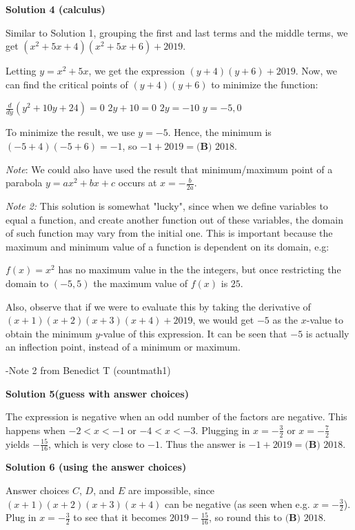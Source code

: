 \begin{enumerate}
 



\textbf{Solution 4 (calculus)}

Similar to Solution 1, grouping the first and last terms and the middle terms, we get $(x^2+5x+4)(x^2+5x+6)+2019$. 

 Letting $y=x^2+5x$, we get the expression $(y+4)(y+6)+2019$. Now, we can find the critical points of $(y+4)(y+6)$ to minimize the function:

 $\frac{d}{dy}(y^2+10y+24)=0$
$2y+10=0$
$2y=-10$
$y=-5,0$

 To minimize the result, we use $y=-5$. Hence, the minimum is $(-5+4)(-5+6)=-1$, so $-1+2019 = \boxed{\textbf{(B) }2018}$.

 \textit{Note}: We could also have used the result that minimum/maximum point of a parabola $y = ax^2 + bx + c$ occurs at $x=-\frac{b}{2a}$.

 \textit{Note 2:} This solution is somewhat "lucky", since when we define variables to equal a function, and create another function out of these variables, the domain of such function may vary from the initial one. This is important because the maximum and minimum value of a function is dependent on its domain, e.g:

 $f(x)=x^2$ has no maximum value in the the integers, but once restricting the domain to $(-5, 5)$ the maximum value of $f(x)$ is $25$.

 Also, observe that if we were to evaluate this by taking the derivative of $(x+1)(x+2)(x+3)(x+4)+2019$, we would get $-5$ as the $x$-value to obtain the minimum $y$-value of this expression. It can be seen that $-5$ is actually an inflection point, instead of a minimum or maximum. 

 -Note 2 from Benedict T (countmath1)

 



\textbf{Solution 5(guess with answer choices)}

The expression is negative when an odd number of the factors are negative. This happens when $-2 < x < -1$ or $-4 < x < -3$. Plugging in $x = -\frac32$ or $x = -\frac72$ yields $-\frac{15}{16}$, which is very close to $-1$. Thus the answer is $-1 + 2019 = \boxed{\textbf{(B) }2018}$.

 



\textbf{Solution 6 (using the answer choices)}

Answer choices $C$, $D$, and $E$ are impossible, since $(x+1)(x+2)(x+3)(x+4)$ can be negative (as seen when e.g. $x = -\frac{3}{2}$). Plug in $x = -\frac{3}{2}$ to see that it becomes $2019 - \frac{15}{16}$, so round this to $\boxed{\textbf{(B) }2018}$.


\end{enumerate}
